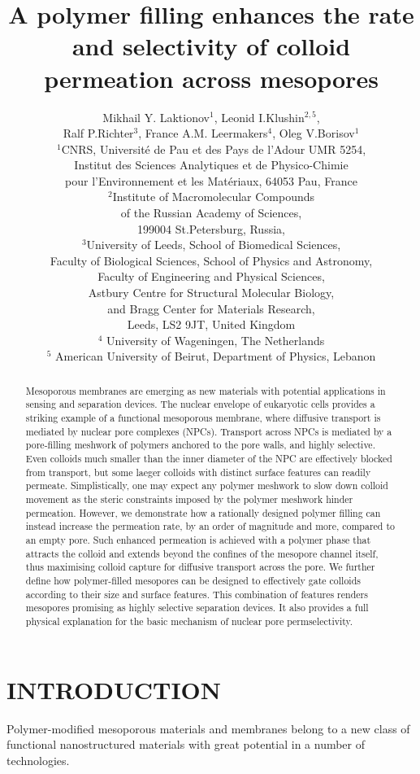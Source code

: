\documentclass[12pt, a4paper]{article}
\title{A polymer filling enhances the rate and selectivity of colloid permeation across mesopores}
\author{Mikhail Y. Laktionov$^1$, Leonid I.Klushin$^{2,5}$,\\Ralf P.Richter$^3$, France A.M. Leermakers$^4$, Oleg V.Borisov$^1$\\
$^{1}$CNRS, Universit\'e de Pau et des Pays de l'Adour UMR 5254,\\
Institut des Sciences Analytiques et de Physico-Chimie\\
pour l'Environnement et les Mat\'eriaux, 64053 Pau, France \\
$^{2}$Institute of Macromolecular Compounds \\
of the Russian Academy of Sciences, \\
199004 St.Petersburg, Russia,\\
$^{3}$University of Leeds, School of Biomedical Sciences, \\
Faculty of Biological Sciences, 
School of Physics and Astronomy, \\
Faculty of Engineering and Physical Sciences,\\  
Astbury Centre for Structural Molecular Biology,\\ 
and Bragg Center for Materials Research,\\ 
Leeds, LS2 9JT, United Kingdom\\
$^{4}$ University of Wageningen, The Netherlands\\
$^{5}$ American University of Beirut, Department of Physics, Lebanon
}
\date{}
\begin{document}
\maketitle

\begin{abstract}

Mesoporous membranes are emerging as new materials with potential applications in sensing and separation devices.
The nuclear envelope of eukaryotic cells provides a striking example of a functional mesoporous membrane, where diffusive transport is mediated by nuclear pore complexes (NPCs).
Transport across NPCs is mediated by a pore-filling meshwork of polymers anchored to the pore walls, and highly selective.
Even colloids much smaller than the inner diameter of the NPC are effectively blocked from transport, but some laeger colloids with distinct surface features can readily permeate.
Simplistically, one may expect any polymer meshwork to slow down colloid movement as the steric constraints imposed by the polymer meshwork hinder permeation.
However, we demonstrate how a rationally designed polymer filling can instead increase the permeation rate, by an order of magnitude and more, compared to an empty pore.
Such enhanced permeation is achieved with a polymer phase that attracts the colloid and extends beyond the confines of the mesopore channel itself, thus maximising colloid capture for diffusive transport across the pore.
We further define how polymer-filled mesopores can be designed to effectively gate colloids according to their size and surface features. 
This combination of features renders mesopores promising as highly selective separation devices.
It also provides a full physical explanation for the basic mechanism of nuclear pore permselectivity.
\end{abstract}


\section{INTRODUCTION}

Polymer-modified mesoporous materials and membranes belong to a new class of functional nanostructured materials with great potential in a number of technologies. 
\end{document}
